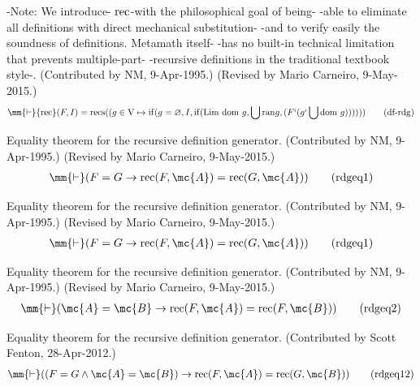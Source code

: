 \begin{metadefinition}
       -Note:  We introduce- ${\rm rec}$-with the philosophical goal of being-
       -able to eliminate all definitions with direct mechanical substitution-
       -and to verify easily the soundness of definitions.  Metamath itself-
       -has no built-in technical limitation that prevents multiple-part-
       -recursive definitions in the traditional textbook style-. 
(Contributed
       by NM, 9-Apr-1995.)  (Revised by Mario Carneiro, 9-May-2015.)
\begin{align}
\mm{\vdash} {\rm rec} ( F , I ) = \mathrm{recs} ( ( g \in {\rm V} \mapsto {\rm
    if} ( g = \varnothing , I , {\rm if} ( {\rm Lim}~ {\rm dom}~ g , \bigcup {\rm
    ran} g , ( F ` ( g ` \bigcup {\rm dom}~ g ) ) ) ) )
    )\label{eq:df-rdg}\tag{df-rdg}
\end{align}
\end{metadefinition}

\begin{lemma} Equality theorem for the recursive
definition generator.  (Contributed
       by NM, 9-Apr-1995.)  (Revised by Mario Carneiro, 9-May-2015.)
\begin{align}
\mm{\vdash} ( F = G \rightarrow {\rm rec} ( F , \mc{A} ) = {\rm rec} ( G ,
    \mc{A} ) )\label{eq:rdgeq1}\tag{rdgeq1}
\end{align}
\end{lemma}


\begin{lemma} Equality theorem for the recursive
definition generator.  (Contributed
       by NM, 9-Apr-1995.)  (Revised by Mario Carneiro, 9-May-2015.)
\begin{align}
\mm{\vdash} ( F = G \rightarrow {\rm rec} ( F , \mc{A} ) = {\rm rec} ( G ,
    \mc{A} ) )\label{eq:rdgeq1}\tag{rdgeq1}
\end{align}
\end{lemma}


\begin{lemma} Equality theorem for the recursive
definition generator.  (Contributed
       by NM, 9-Apr-1995.)  (Revised by Mario Carneiro, 9-May-2015.)
\begin{align}
\mm{\vdash} ( \mc{A} = \mc{B} \rightarrow {\rm rec} ( F , \mc{A} ) = {\rm rec}
    ( F , \mc{B} ) )\label{eq:rdgeq2}\tag{rdgeq2}
\end{align}
\end{lemma}


\begin{lemma} Equality theorem for the recursive
definition generator.  (Contributed by
     Scott Fenton, 28-Apr-2012.)
\begin{align}
\mm{\vdash} ( ( F = G \wedge \mc{A} = \mc{B} ) \rightarrow {\rm rec} ( F ,
    \mc{A} ) = {\rm rec} ( G , \mc{B} ) )\label{eq:rdgeq12}\tag{rdgeq12}
\end{align}
\end{lemma}



